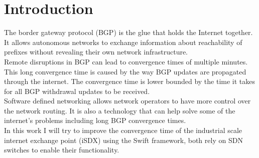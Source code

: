 

\chapter{\label{introduction}Introduction}
The border gateway protocol (BGP) is the glue that holds the Internet together. It allows autonomous networks to exchange information about reachability of prefixes without revealing their own network infrastructure. \\
Remote disruptions in BGP can lead to convergence times of multiple minutes. This long convergence time is caused by the way BGP updates are propagated through the internet. The convergence time is lower bounded by the time it takes for all BGP withdrawal updates to be received. \\
Software defined networking allows network operators to have more control over the network routing. It is also a technology that can help solve some of the internet's problems including long BGP convergence times. \\
In this work I will try to improve the convergence time of the industrial scale internet exchange point (iSDX) using the Swift framework, both rely on SDN switches to enable their functionality. 


